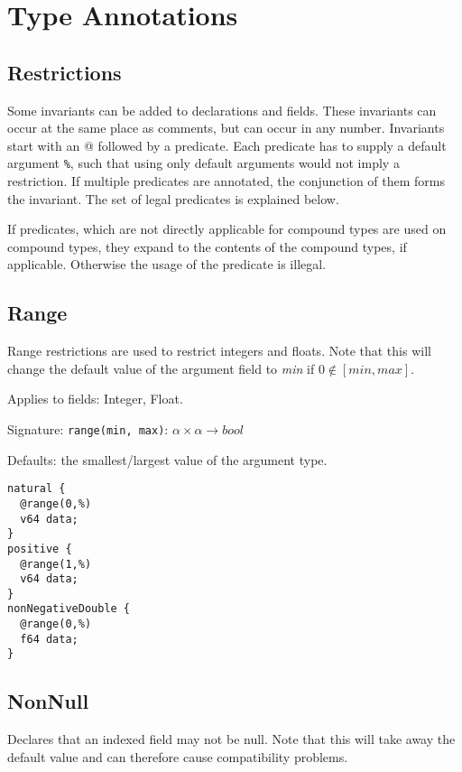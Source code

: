 \section{Type Annotations}

\subsection{Restrictions}
\label{restrictions}

Some invariants can be added to declarations and fields. These invariants can occur at the same place as comments, but can occur in any number. Invariants start with an \textsc{@} followed by a predicate. Each predicate has to supply a default argument \texttt{\%}, such that using only default arguments would not imply a restriction.
If multiple predicates are annotated, the conjunction of them forms the invariant.
The set of legal predicates is explained below.

If predicates, which are not directly applicable for compound types are used on compound types, they expand to the contents of the compound types, if applicable. Otherwise the usage of the predicate is illegal.



\subsection*{Range}
Range restrictions are used to restrict integers and floats. Note that this will change the default value of the argument field to \textit{min} if $0 \notin [min,max]$.

Applies to fields: Integer, Float.

Signature: \verb/range(min, max)/: $\alpha \times \alpha → bool$

Defaults: the smallest/largest value of the argument type.

\begin{lstlisting}[label=rangeExample,caption=Examples,language=skill]
natural {
  @range(0,%)
  v64 data;
}
positive {
  @range(1,%)
  v64 data;
}
nonNegativeDouble {
  @range(0,%)
  f64 data;
}
\end{lstlisting}

\subsection*{NonNull}
Declares that an indexed field may not be null. Note that this will take away the default value and can therefore cause compatibility problems.

